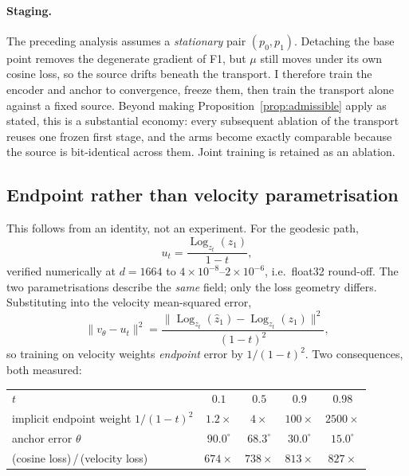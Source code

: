 \documentclass[11pt,a4paper]{article}
\newcommand{\Log}{\operatorname{Log}}
\theoremstyle{plain}
\theoremstyle{remark}
\begin{document}
\paragraph{Staging.} The preceding analysis assumes a \emph{stationary} pair
$(p_0,p_1)$. Detaching the base point removes the degenerate gradient of F1, but
$\mu$ still moves under its own cosine loss, so the source drifts beneath the
transport. I therefore train the encoder and anchor to convergence, freeze them,
then train the transport alone against a fixed source. Beyond making
Proposition~\ref{prop:admissible} apply as stated, this is a substantial economy:
every subsequent ablation of the transport reuses one frozen first stage, and
the arms become exactly comparable because the source is bit-identical across
them. Joint training is retained as an ablation.

\subsection{Endpoint rather than velocity parametrisation}
\label{sec:param}

This follows from an identity, not an experiment. For the geodesic path,
\begin{equation}\label{eq:identity}
u_t=\frac{\Log_{z_t}(z_1)}{1-t},
\end{equation}
verified numerically at $d=1664$ to $4\times10^{-8}$--$2\times10^{-6}$, i.e.\
float32 round-off. The two parametrisations describe the \emph{same} field; only
the loss geometry differs. Substituting into the velocity mean-squared error,
\begin{equation}
\lVert v_\theta-u_t\rVert^2
=\frac{\lVert\Log_{z_t}(\hat z_1)-\Log_{z_t}(z_1)\rVert^2}{(1-t)^2},
\end{equation}
so training on velocity weights \emph{endpoint} error by $1/(1-t)^2$. Two
consequences, both measured:

\begin{center}
\footnotesize
\begin{tabular}{@{}lcccc@{}}
\toprule
$t$ & $0.1$ & $0.5$ & $0.9$ & $0.98$ \\
implicit endpoint weight $1/(1-t)^2$ & $1.2\times$ & $4\times$ & $100\times$ & $2500\times$ \\
\midrule
anchor error $\theta$ & $90.0^\circ$ & $68.3^\circ$ & $30.0^\circ$ & $15.0^\circ$ \\
(cosine loss)\,/\,(velocity loss) & $674\times$ & $738\times$ & $813\times$ & $827\times$ \\
\bottomrule
\end{tabular}
\end{center}
\end{document}
